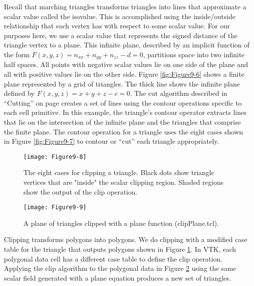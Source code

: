 Recall that marching triangles transforms triangles into lines that approximate a scalar value called the isovalue. This is accomplished using the inside/outside relationship that each vertex has with respect to some scalar value. For our purposes here, we use a scalar value that represents the signed distance of the triangle vertex to a plane. This infinite plane, described by an implicit function of the form $F(x, y, z) = n_{xx} + n_{yy} + n_{zz} - d = 0$, partitions space into two infinite half spaces. All points with negative scalar values lie on one side of the plane and all with positive values lie on the other side. Figure \ref{fig:Figure9-6} shows a finite plane represented by a grid of triangles. The thick line shows the infinite plane defined by $F(x,y,z) = x + y + z - c = 0$. The cut algorithm described in ``Cutting'' on page \pageref{subsec:cutting} creates a set of lines using the contour operations specific to each cell primitive. In this example, the triangle's contour operator extracts lines that lie on the intersection of the infinite plane and the triangles that comprise the finite plane. The contour operation for a triangle uses the eight cases shown in Figure \ref{fig:Figure9-7} to contour or ``cut'' each triangle appropriately.

\begin{figure}[!htb]
    \centering
    \texttt{[image: Figure9-8]}\\
    \caption{The eight cases for clipping a triangle. Black dots show triangle vertices that are "inside" the scalar clipping region. Shaded regions show the output of the clip operation.}\label{fig:Figure9-8}
\end{figure}

\begin{figure}[!htb]
    \centering
    \texttt{[image: Figure9-9]}\\
    \caption{A plane of triangles clipped with a plane function (clipPlane.tcl).}\label{fig:Figure9-9}
\end{figure}

Clipping transforms polygons into polygons. We do clipping with a modified case table for the triangle that outputs polygons shown in Figure \ref{fig:Figure9-8}. In VTK, each polygonal data cell has a different case table to define the clip operation. Applying the clip algorithm to the polygonal data in Figure \ref{fig:Figure9-9} using the same scalar field generated with a plane equation produces a new set of triangles.

